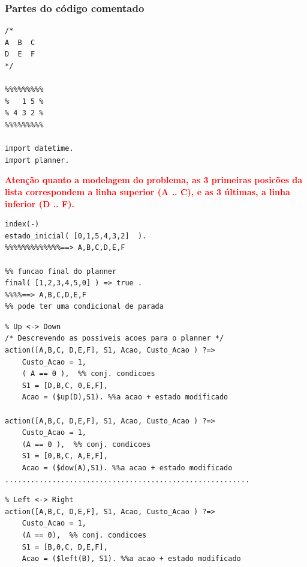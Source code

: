 \begin{frame}[fragile, allowframebreaks=0.9]
 \frametitle{Partes do  código comentado}


\begin{footnotesize}
\begin{verbatim}
/*
A  B  C 
D  E  F
*/

%%%%%%%%%
%   1 5 %
% 4 3 2 %
%%%%%%%%%

import datetime.
import planner.
\end{verbatim}
\end{footnotesize}

\begin{center}
\textbf{\textcolor{red}{Atenção quanto a modelagem do problema, as 3 primeiras posicões da lista
correspondem a linha superior (A .. C), e as 3 últimas, a linha inferior (D .. F).}
}
\end{center}

\framebreak

\begin{footnotesize}
\begin{verbatim}
index(-)
estado_inicial( [0,1,5,4,3,2]  ).
%%%%%%%%%%%%%==> A,B,C,D,E,F

%% funcao final do planner
final( [1,2,3,4,5,0] ) => true .
%%%%==> A,B,C,D,E,F
%% pode ter uma condicional de parada

\end{verbatim}

\end{footnotesize}
\framebreak

\begin{footnotesize}
\begin{verbatim}
% Up <-> Down
/* Descrevendo as possiveis acoes para o planner */
action([A,B,C, D,E,F], S1, Acao, Custo_Acao ) ?=>
    Custo_Acao = 1,
    ( A == 0 ),  %% conj. condicoes
    S1 = [D,B,C, 0,E,F], 
    Acao = ($up(D),S1). %%a acao + estado modificado

action([A,B,C, D,E,F], S1, Acao, Custo_Acao ) ?=>
    Custo_Acao = 1,
    (A == 0 ),  %% conj. condicoes
    S1 = [0,B,C, A,E,F],
    Acao = ($dow(A),S1). %%a acao + estado modificado
.........................................................
\end{verbatim}
\end{footnotesize}

\framebreak


\begin{footnotesize}
\begin{verbatim}
% Left <-> Right
action([A,B,C, D,E,F], S1, Acao, Custo_Acao ) ?=>
    Custo_Acao = 1,
    (A == 0),  %% conj. condicoes
    S1 = [B,0,C, D,E,F],
    Acao = ($left(B), S1). %%a acao + estado modificado
    

\end{verbatim}
\end{footnotesize}
\end{frame}
